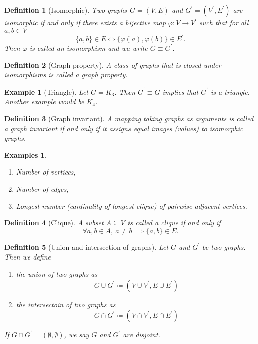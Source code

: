 \documentclass[a4paper]{article}
\newtheorem*{defi*}{Definition}
\newtheorem*{ex}{Example}
\newtheorem*{exs}{Examples}
\begin{document}
\begin{defi*}[Isomorphic]
  Two graphs $G= (V,E)$ and $G^\prime = (V^\prime,E^\prime)$ are \emph{isomorphic} if and only if there exists a bijective map $\varphi: V \to V^\prime$ such that for all $a,b \in V$ 
  \[ \{a,b\} \in E \iff \{ \varphi(a),\varphi(b)\} \in E^\prime \text{.} \]
  Then $\varphi$ is called an \emph{isomorphism} and we write $G \equiv G^\prime$.
\end{defi*}

\begin{defi*}[Graph property]
  A class of graphs that is closed under isomorphisms is called a \emph{graph property}.
\end{defi*}

\begin{ex}[Triangle]
  Let $G = K_3$. Then $G^\prime \equiv G$ implies that $G^\prime$ is a triangle.\\
  Another example would be $K_4$.
\end{ex}

\begin{defi*}[Graph invariant]
  A mapping taking graphs as arguments is called a graph invariant if and only if it assigns equal images (values) to isomorphic graphs.
\end{defi*}

\begin{exs}
  \begin{enumerate}
    \item Number of vertices,
    \item Number of edges,
    \item Longest number (cardinality of longest clique) of pairwise adjacent vertices.
  \end{enumerate}
\end{exs}

\begin{defi*}[Clique]
  A subset $A \subseteq V$ is called a \emph{clique} if and only if 
  \[ \forall a,b \in A, \: a \neq b \implies \{a,b\} \in E \text{.} \]
\end{defi*}

\begin{defi*}[Union and intersection of graphs]
  Let $G$ and $G^\prime$ be two graphs. Then we define
  \begin{enumerate}
    \item the \emph{union} of two graphs as
    \[ G \cup G^\prime \coloneqq (V \cup V^\prime, E \cup E^\prime) \]
    \item the \emph{intersectoin} of two graphs as
    \[ G \cap G^\prime \coloneqq (V \cap V^\prime, E \cap E^\prime) \]
  \end{enumerate}
  If $G \cap G^\prime = (\emptyset,\emptyset)$, we say $G$ and $G^\prime$ are \emph{disjoint}.
\end{defi*}
\end{document}
